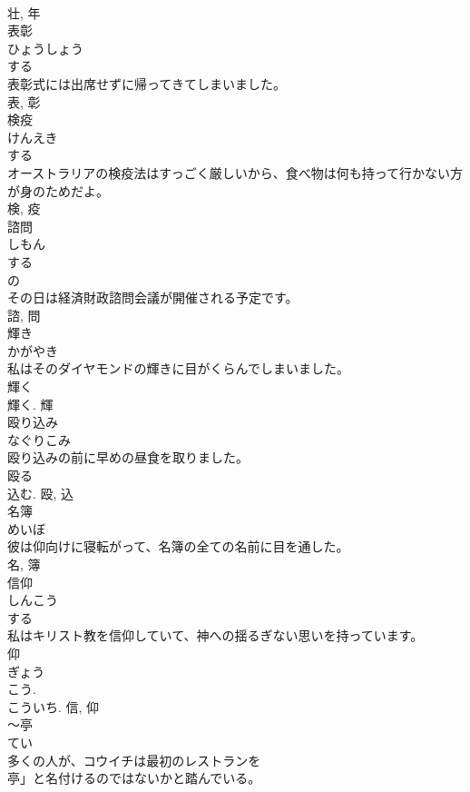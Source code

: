 \documentclass[8pt]{extreport}
\begin{document}
\begin{CJK}{UTF8}{min}
\\	壮, 年	
\\	表彰	
\\	ひょうしょう	
\\	する 
\\	表彰式には出席せずに帰ってきてしまいました。	
\\	表, 彰	
\\	検疫	
\\	けんえき	
\\	する 
\\	オーストラリアの検疫法はすっごく厳しいから、食べ物は何も持って行かない方が身のためだよ。	
\\	検, 疫	
\\	諮問	
\\	しもん	
\\	する 
\\	の 
\\	その日は経済財政諮問会議が開催される予定です。	
\\	諮, 問	
\\	輝き	
\\	かがやき	
\\	私はそのダイヤモンドの輝きに目がくらんでしまいました。	
\\	輝く 
\\	輝く.	輝	
\\	殴り込み	
\\	なぐりこみ	
\\	殴り込みの前に早めの昼食を取りました。	
\\	殴る 
\\	込む.	殴, 込	
\\	名簿	
\\	めいぼ	
\\	彼は仰向けに寝転がって、名簿の全ての名前に目を通した。	
\\	名, 簿	
\\	信仰	
\\	しんこう	
\\	する 
\\	私はキリスト教を信仰していて、神への揺るぎない思いを持っています。	
\\	仰 
\\	ぎょう 
\\	こう. 
\\	こういち.	信, 仰	
\\	〜亭	
\\	てい	
\\	多くの人が、コウイチは最初のレストランを
\\	亭」と名付けるのではないかと踏んでいる。	

\end{CJK}
\end{document}
